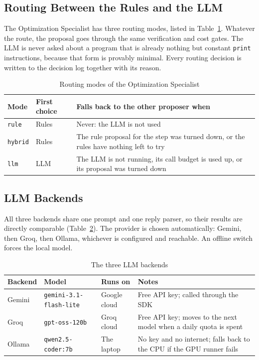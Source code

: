 \documentclass[12pt,a4paper]{report}
\begin{document}
\subsection{Routing Between the Rules and the LLM}

The Optimization Specialist has three routing modes, listed in Table~\ref{tab:routing}. Whatever the route, the proposal goes through the same verification and cost gates. The LLM is never asked about a program that is already nothing but constant \texttt{print} instructions, because that form is provably minimal. Every routing decision is written to the decision log together with its reason.

\begin{table}[H]
\centering
\caption{Routing modes of the Optimization Specialist}
\label{tab:routing}
\begin{tabularx}{\textwidth}{|l|l|X|}
\hline
\textbf{Mode} & \textbf{First choice} & \textbf{Falls back to the other proposer when} \\
\hline
\texttt{rule} & Rules & Never: the LLM is not used \\
\hline
\texttt{hybrid} & Rules & The rule proposal for the step was turned down, or the rules have nothing left to try \\
\hline
\texttt{llm} & LLM & The LLM is not running, its call budget is used up, or its proposal was turned down \\
\hline
\end{tabularx}
\end{table}

\subsection{LLM Backends}

All three backends share one prompt and one reply parser, so their results are directly comparable (Table~\ref{tab:backends}). The provider is chosen automatically: Gemini, then Groq, then Ollama, whichever is configured and reachable. An offline switch forces the local model.

\begin{table}[H]
\centering
\caption{The three LLM backends}
\label{tab:backends}
\small
\begin{tabularx}{\textwidth}{|l|l|l|X|}
\hline
\textbf{Backend} & \textbf{Model} & \textbf{Runs on} & \textbf{Notes} \\
\hline
Gemini & \texttt{gemini-3.1-flash-lite} & Google cloud & Free API key; called through the SDK \\
\hline
Groq & \texttt{gpt-oss-120b} & Groq cloud & Free API key; moves to the next model when a daily quota is spent \\
\hline
Ollama & \texttt{qwen2.5-coder:7b} & The laptop & No key and no internet; falls back to the CPU if the GPU runner fails \\
\hline
\end{tabularx}
\end{table}
\end{document}
